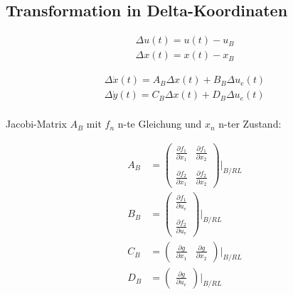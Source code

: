 \documentclass[10pt,a4paper]{article}
\begin{document}
  \subsection{Transformation in Delta-Koordinaten}
  \begin{mdframed}[style=exercise]
    \begin{align}
        \Delta u(t) = u(t) - u_B \\
        \Delta x(t) = x(t) - x_B
    \end{align}
  \end{mdframed}
  \begin{mdframed}[style=exercise]
    \begin{align}
        \Delta \dot{x}(t) = A_B \Delta x(t) + B_B \Delta u_e(t) \\
        \Delta \dot{y}(t) = C_B \Delta x(t) + D_B \Delta u_e(t) \\
    \end{align}
  \end{mdframed}
Jacobi-Matrix $A_B$ mit $f_n$ n-te Gleichung und $x_n$ n-ter Zustand:
  \begin{mdframed}[style=exercise]
    \begin{align}
        A_B &= 
        \begin{pmatrix}
            \frac{\partial f_1}{\partial x_1} & \frac{\partial f_1}{\partial x_2} \\ \\
            \frac{\partial f_2}{\partial x_1} & \frac{\partial f_2}{\partial x_2} 
        \end{pmatrix}|_{B/RL} \\
        B_B &= 
        \begin{pmatrix}
            \frac{\partial f_1}{\partial u_e}  \\ \\
            \frac{\partial f_2}{\partial u_e}  
        \end{pmatrix}|_{B/RL} \\
        C_B &= 
        \begin{pmatrix}
            \frac{\partial g}{\partial x_1} & \frac{\partial g}{\partial x_2}  
        \end{pmatrix}|_{B/RL} \\
        D_B &= 
        \begin{pmatrix}
            \frac{\partial g}{\partial u_e}
        \end{pmatrix}|_{B/RL} 
    \end{align}
  \end{mdframed}
\end{document}
